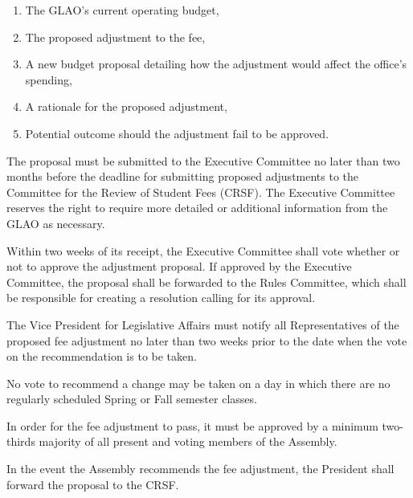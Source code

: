 \begin{bylaws-number}
\begin{bylaws-number}
\begin{enumerate}[i]
  \item The GLAO’s current operating budget,
  \item The proposed adjustment to the fee,
  \item A new budget proposal detailing how the adjustment would affect the office’s spending,
  \item A rationale for the proposed adjustment,
  \item Potential outcome should the adjustment fail to be approved.
\end{enumerate}
  \item The proposal must be submitted to the Executive Committee no later than two months before the deadline for submitting proposed adjustments to the Committee for the Review of Student Fees (CRSF). The Executive Committee reserves the right to require more detailed or additional information from the GLAO as necessary.
  \item Within two weeks of its receipt, the Executive Committee shall vote whether or not to approve the adjustment proposal. If approved by the Executive Committee, the proposal shall be forwarded to the Rules Committee, which shall be responsible for creating a resolution calling for its approval.
  \item The Vice President for Legislative Affairs must notify all Representatives of the proposed fee adjustment no later than two weeks prior to the date when the vote on the recommendation is to be taken.
  \item No vote to recommend a change may be taken on a day in which there are no regularly scheduled Spring or Fall semester classes.
  \item In order for the fee adjustment to pass, it must be approved by a minimum two-thirds majority of all present and voting members of the Assembly.
  \item In the event the Assembly recommends the fee adjustment, the President shall forward the proposal to the CRSF.
\end{bylaws-number}
\end{bylaws-number}

